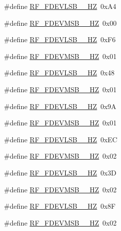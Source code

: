 \begin{DoxyCompactItemize}
\item 
\#define \mbox{\hyperlink{sx1276_regs-_fsk_8h_a0751e1ea52818613b7a5e3476607f646}{R\+F\+\_\+\+F\+D\+E\+V\+L\+S\+B\+\_\+\_\+\+HZ}}~0x\+A4
\item 
\#define \mbox{\hyperlink{sx1276_regs-_fsk_8h_a91093fabca4892b315095dc0283828c7}{R\+F\+\_\+\+F\+D\+E\+V\+M\+S\+B\+\_\+\_\+\+HZ}}~0x00
\item 
\#define \mbox{\hyperlink{sx1276_regs-_fsk_8h_a5331d1f2a7cd8c568218d901d2a388ce}{R\+F\+\_\+\+F\+D\+E\+V\+L\+S\+B\+\_\+\_\+\+HZ}}~0x\+F6
\item 
\#define \mbox{\hyperlink{sx1276_regs-_fsk_8h_ada7253b158b4a51d4a8621eff8d3aa59}{R\+F\+\_\+\+F\+D\+E\+V\+M\+S\+B\+\_\+\_\+\+HZ}}~0x01
\item 
\#define \mbox{\hyperlink{sx1276_regs-_fsk_8h_a6e922112d9f9ada8500acab833bec19d}{R\+F\+\_\+\+F\+D\+E\+V\+L\+S\+B\+\_\+\_\+\+HZ}}~0x48
\item 
\#define \mbox{\hyperlink{sx1276_regs-_fsk_8h_a93a967f33b1732e004831862b3d4964f}{R\+F\+\_\+\+F\+D\+E\+V\+M\+S\+B\+\_\+\_\+\+HZ}}~0x01
\item 
\#define \mbox{\hyperlink{sx1276_regs-_fsk_8h_a391d42e4ff6fa112df9198fb1a1803fe}{R\+F\+\_\+\+F\+D\+E\+V\+L\+S\+B\+\_\+\_\+\+HZ}}~0x9A
\item 
\#define \mbox{\hyperlink{sx1276_regs-_fsk_8h_a6b95e0d91882f1c75092a944ccdf8952}{R\+F\+\_\+\+F\+D\+E\+V\+M\+S\+B\+\_\+\_\+\+HZ}}~0x01
\item 
\#define \mbox{\hyperlink{sx1276_regs-_fsk_8h_a30c6d67de342780865db12984208b286}{R\+F\+\_\+\+F\+D\+E\+V\+L\+S\+B\+\_\+\_\+\+HZ}}~0x\+EC
\item 
\#define \mbox{\hyperlink{sx1276_regs-_fsk_8h_aae123662302055b52008db80777f3bad}{R\+F\+\_\+\+F\+D\+E\+V\+M\+S\+B\+\_\+\_\+\+HZ}}~0x02
\item 
\#define \mbox{\hyperlink{sx1276_regs-_fsk_8h_ae12db3f305913ae3a16466507fdd3d3c}{R\+F\+\_\+\+F\+D\+E\+V\+L\+S\+B\+\_\+\_\+\+HZ}}~0x3D
\item 
\#define \mbox{\hyperlink{sx1276_regs-_fsk_8h_aa12a12d2a93e1a5c35134219f35bb51c}{R\+F\+\_\+\+F\+D\+E\+V\+M\+S\+B\+\_\+\_\+\+HZ}}~0x02
\item 
\#define \mbox{\hyperlink{sx1276_regs-_fsk_8h_a635b9754fb64e7fa3d62a0eb3a00e086}{R\+F\+\_\+\+F\+D\+E\+V\+L\+S\+B\+\_\+\_\+\+HZ}}~0x8F
\item 
\#define \mbox{\hyperlink{sx1276_regs-_fsk_8h_a5e36011fe2f0d8bee1bd3aa9a928c18c}{R\+F\+\_\+\+F\+D\+E\+V\+M\+S\+B\+\_\+\_\+\+HZ}}~0x02

\end{DoxyCompactItemize}

